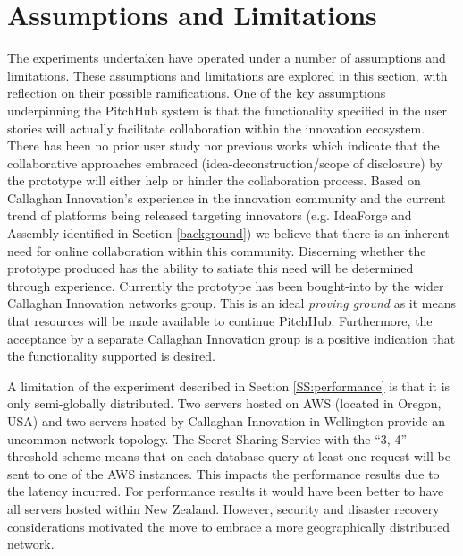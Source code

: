 \section{Assumptions and Limitations}
The experiments undertaken have operated under a number of assumptions and limitations. These assumptions and limitations are explored in this section, with reflection on their possible ramifications.
One of the key assumptions underpinning the PitchHub system is that the functionality specified in the user stories will actually facilitate collaboration within the innovation ecosystem. There has been no prior user study nor previous works which indicate that the collaborative approaches embraced (idea-deconstruction/scope of disclosure) by the prototype will either help or hinder the collaboration process. Based on Callaghan Innovation's experience in the innovation community and the current trend of platforms being released targeting innovators (e.g. IdeaForge and Assembly identified in Section \ref{background}) we believe that there is an inherent need for online collaboration within this community. Discerning whether the prototype produced has the ability to satiate this need will be determined through experience. Currently the prototype has been bought-into by the wider Callaghan Innovation networks group. This is an ideal \textit{proving ground} as it means that resources will be made available to continue PitchHub. Furthermore, the acceptance by a separate Callaghan Innovation group is a positive indication that the functionality supported is desired.

A limitation of the experiment described in Section \ref{SS:performance} is that it is only semi-globally distributed. Two servers hosted on AWS (located in Oregon, USA) and two servers hosted by Callaghan Innovation in Wellington provide an uncommon network topology. The Secret Sharing Service with the ``3, 4'' threshold scheme means that on each database query at least one request will be sent to one of the AWS instances. This impacts the performance results due to the latency incurred. For performance results it would have been better to have all servers hosted within New Zealand. However, security and disaster recovery considerations motivated the move to embrace a more geographically distributed network.

